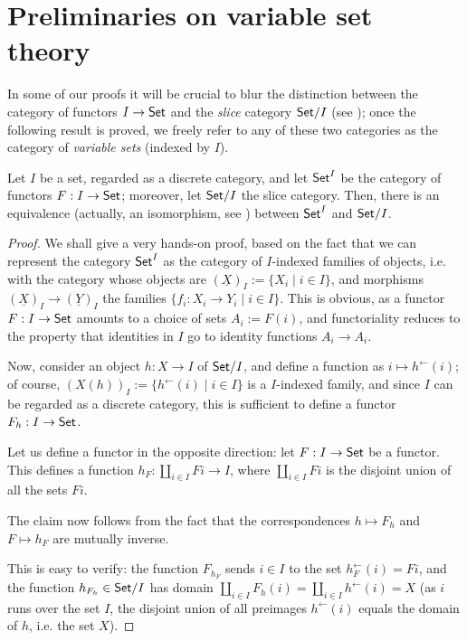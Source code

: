 \section{Preliminaries on variable set theory}
In some of our proofs it will be crucial to blur the distinction between the category of functors $I \to \mathsf{Set}$ and the \emph{slice} category $\mathsf{Set}/I$ (see \cite[1.6.1]{Bor1}); once the following result is proved, we freely refer to any of these two categories as the category of \emph{variable sets} (indexed by $I$).
\begin{proposition}\label{variabbo_set}
	Let $I$ be a set, regarded as a discrete category, and let $\mathsf{Set}^I$ be the category of functors $F : I \to \mathsf{Set}$; moreover, let $\mathsf{Set}/I$ the slice category. Then, there is an equivalence (actually, an isomorphism, see \cite[1.5.1]{Bor1}) between $\mathsf{Set}^I$ and $\mathsf{Set}/I$.
\end{proposition}
\begin{proof}
	We shall give a very hands-on proof, based on the fact that we can represent the category $\mathsf{Set}^I$ as the category of $I$-indexed families of objects, i.e. with the category whose objects are $(\underline X)_I := \{X_i\mid i\in I\}$, and morphisms $(\underline X)_I\to (\underline Y)_I$ the families $\{f_i : X_i \to Y_i\mid i \in I\}$. This is obvious, as a functor $F : I \to \mathsf{Set}$ amounts to a choice of sets $A_i := F(i)$, and functoriality reduces to the property that identities in $I$ go to identity functions $A_i \to A_i$.

	Now, consider an object $h : X\to I$ of $\mathsf{Set}/I$, and define a function as $i\mapsto h^\leftarrow(i)$; of course, $(X(h))_I := \{h^\leftarrow(i) \mid i \in I\}$ is a $I$-indexed family, and since $I$ can be regarded as a discrete category, this is sufficient to define a functor $F_h : I \to \mathsf{Set}$.

	Let us define a functor in the opposite direction: let $F : I \to \mathsf{Set}$ be a functor. This defines a function $h_F : \coprod_{i\in I}Fi \to I$, where $\coprod_{i\in I} Fi$ is the disjoint union of all the sets $Fi$.

	The claim now follows from the fact that the correspondences $h\mapsto F_h$ and $F\mapsto h_F$ are mutually inverse.

	This is easy to verify: the function $F_{h_F}$ sends $i\in I$ to the set $h_F^\leftarrow(i)=Fi$, and the function $h_{F_h} \in \mathsf{Set}/I$ has domain $\coprod_{i\in I}F_h(i) = \coprod_{i\in I}h^\leftarrow(i)=X$ (as $i$ runs over the set $I$, the disjoint union of all preimages $h^\leftarrow(i)$ equals the domain of $h$, i.e. the set $X$).
\end{proof}
